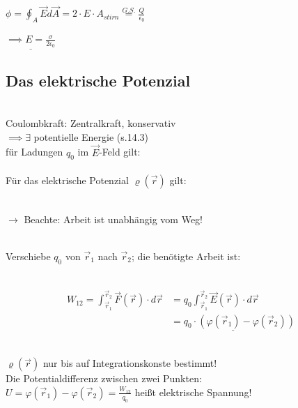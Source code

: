 \documentclass[11pt]{article}
\begin{document}
$ \phi=\oint_{A} \vec{E}d\vec{A}=2\cdot E\cdot A_{stirn}\overset{G.S.}{=}\frac{Q}{\epsilon_0}$ 

$ \underline{\implies E=\frac{\sigma}{2\epsilon_0}} $

\subsection{Das elektrische Potenzial}
\\
Coulombkraft: Zentralkraft, konservativ
\hfill\\
$\implies \exists$ potentielle Energie (s.14.3)
\hfill\\
für Ladungen $q_0$ im $\vec{E}$-Feld gilt:
\hfill\\
\hfill\\
Für das elektrische Potenzial $ \varrho(\vec{r}) $ gilt:
\hfill\\

\hfill\\

$\rightarrow$ Beachte: Arbeit ist unabhängig vom Weg!

\hfill\\

Verschiebe $q_0$ von $\vec{r}_1$ nach $\vec{r}_2$; die benötigte Arbeit ist:

\hfill\\

\begin{align*}
	\displaystyle W_{12}= \int_{\vec{r}_1}^{\vec{r}_2} \vec{F}(\vec{r})\cdot d\vec{r} & = q_0\int_{\vec{r}_1}^{\vec{r}_2} \vec{E}(\vec{r})\cdot d\vec{r} \\
	&\underline{ =q_0\cdot(\varphi(\vec{r}_1)-\varphi(\vec{r}_2))}
\end{align*}

\hfill\\

$ \varrho(\vec{r}) $ nur bis auf Integrationskonste bestimmt!\\
Die Potentialdifferenz zwischen zwei Punkten:\\

$ U = \varphi(\vec{r}_1)-\varphi(\vec{r}_2) = \frac{W_{12}}{q_0}$ heißt elektrische Spannung!

\hfill\\
\end{document}
